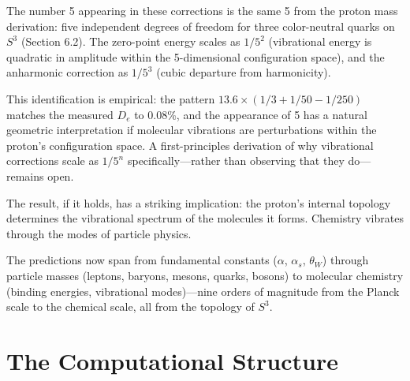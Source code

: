 \documentclass[12pt]{article}
\begin{document}
\begin{center}
\end{center}

\medskip
The number 5 appearing in these corrections is the same 5 from the proton mass derivation: five independent degrees of freedom for three color-neutral quarks on $S^3$ (Section 6.2). The zero-point energy scales as $1/5^2$ (vibrational energy is quadratic in amplitude within the 5-dimensional configuration space), and the anharmonic correction as $1/5^3$ (cubic departure from harmonicity).

This identification is empirical: the pattern $13.6 \times (1/3 + 1/50 - 1/250)$ matches the measured $D_e$ to 0.08\%, and the appearance of 5 has a natural geometric interpretation if molecular vibrations are perturbations within the proton's configuration space. A first-principles derivation of why vibrational corrections scale as $1/5^n$ specifically---rather than observing that they do---remains open.

The result, if it holds, has a striking implication: the proton's internal topology determines the vibrational spectrum of the molecules it forms. Chemistry vibrates through the modes of particle physics.

\medskip
The predictions now span from fundamental constants ($\alpha$, $\alpha_s$, $\theta_W$) through particle masses (leptons, baryons, mesons, quarks, bosons) to molecular chemistry (binding energies, vibrational modes)---nine orders of magnitude from the Planck scale to the chemical scale, all from the topology of $S^3$.
\section{The Computational Structure}
\end{document}

